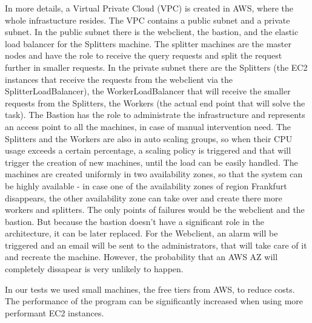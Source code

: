 \documentclass{acm_proc_article-sp}
\begin{document}
In more details, a Virtual Private Cloud (VPC) is created in AWS, where the whole  infrastucture resides.
The VPC contains a public subnet and a private subnet. 
In the public subnet there is the webclient, the bastion, and the elastic load balancer for the Splitters machine.
The splitter machines are the master nodes and have the role to receive the query requests and split the request further in smaller requests. 
In the private subnet there are the Splitters (the EC2 instances that receive the requests from the webclient via the SplitterLoadBalancer), the WorkerLoadBalancer that will receive the smaller requests from the Splitters, the Workers (the actual end point that will solve the task). 
The Bastion has the role to administrate the infrastructure and represents an access point to all the machines, in case of manual intervention need.
The Splitters and the Workers are also in auto scaling groups, so when their CPU usage exceeds a certain percentage, a scaling policy is triggered and that will trigger the creation of new machines, until the load can be easily handled. 
The machines are created uniformly in two availability zones, so that the system can be highly available - in case one of the availability zones of region Frankfurt disappears, the other availability zone can take over and create there more workers and splitters. 
The only points of failures would be the webclient and the bastion. 
But because the bastion doesn't have a significant role in the architecture, it can be later replaced. 
For the Webclient, an alarm will be triggered and an email will be sent to the administrators, that will take care of it and recreate the machine. 
However, the probability that an AWS AZ will completely dissapear is very unlikely to happen.

In our tests we used small machines, the free tiers from AWS, to reduce costs. 
The performance of the program can be significantly increased when using more performant EC2 instances. 
\end{document}
